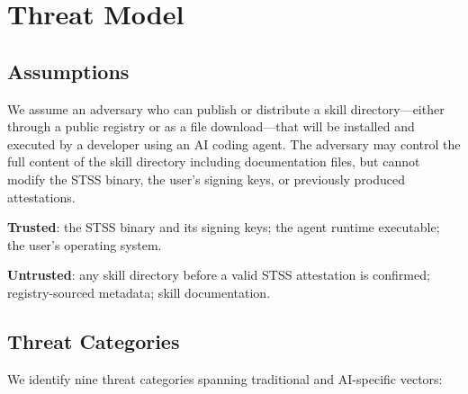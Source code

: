 \documentclass[11pt,twocolumn]{article}
\begin{document}
\section{Threat Model}
\label{sec:threat}

\subsection{Assumptions}

We assume an adversary who can publish or distribute a skill directory---either
through a public registry or as a file download---that will be installed and
executed by a developer using an AI coding agent. The adversary may control
the full content of the skill directory including documentation files, but
cannot modify the STSS binary, the user's signing keys, or previously produced
attestations.

\textbf{Trusted}: the STSS binary and its signing keys; the agent runtime
executable; the user's operating system.

\textbf{Untrusted}: any skill directory before a valid STSS attestation
is confirmed; registry-sourced metadata; skill documentation.

\subsection{Threat Categories}

We identify nine threat categories spanning traditional and AI-specific vectors:
\end{document}
